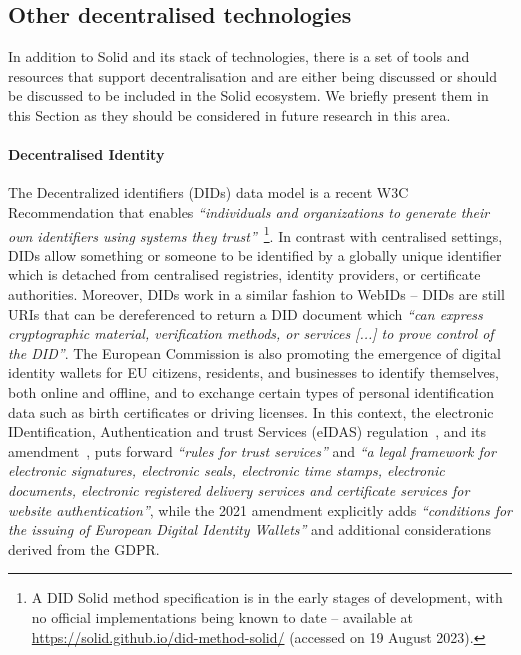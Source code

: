 \subsection{Other decentralised technologies}
\label{sec:sota_other_technologies}

In addition to Solid and its stack of technologies, there is a set of tools and resources that support decentralisation and are either being discussed or should be discussed to be included in the Solid ecosystem.
We briefly present them in this Section as they should be considered in future research in this area.

\paragraph{Decentralised Identity}
The Decentralized identifiers (DIDs) data model is a recent W3C Recommendation that enables \textit{``individuals and organizations to generate their own identifiers using systems they trust''}~\citep{sporny_decentralized_2022}\footnote{A DID Solid method specification is in the early stages of development, with no official implementations being known to date -- available at \url{https://solid.github.io/did-method-solid/} (accessed on 19 August 2023).}.
In contrast with centralised settings, DIDs allow something or someone to be identified by a globally unique identifier which is detached from centralised registries, identity providers, or certificate authorities.
Moreover, DIDs work in a similar fashion to WebIDs -- DIDs are still URIs that can be dereferenced to return a DID document which \textit{``can express cryptographic material, verification methods, or services [...] to prove control of the DID''}.
The European Commission is also promoting the emergence of digital identity wallets for EU citizens, residents, and businesses to identify themselves, both online and offline, and to exchange certain types of personal identification data such as birth certificates or driving licenses.
In this context, the electronic IDentification, Authentication and trust Services (eIDAS) regulation~\citeyearpar{noauthor_regulation_2014}, and its amendment~\citeyearpar{noauthor_eidas2_2021}, puts forward \textit{``rules for trust services''} and \textit{``a legal framework for electronic signatures, electronic seals, electronic time stamps, electronic documents, electronic registered delivery services and certificate services for website authentication''}, while the 2021 amendment explicitly adds \textit{``conditions for the issuing of European Digital Identity Wallets''} and additional considerations derived from the GDPR.

